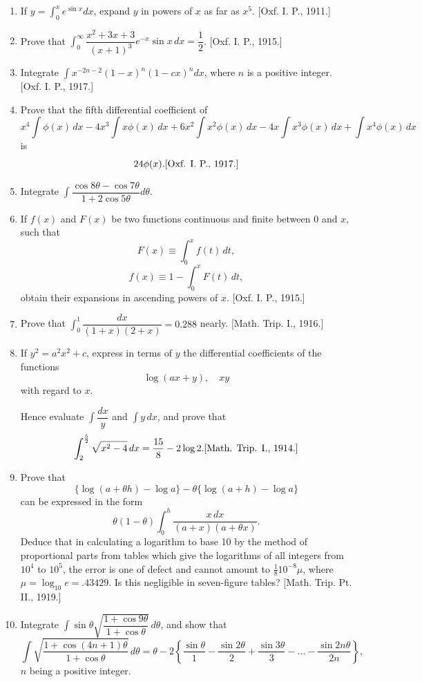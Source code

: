 \documentclass[11pt, a4paper]{article}
\newcommand{\source}[1]{\hfill\textnormal{[#1]}}
\begin{document}
\begin{enumerate}[leftmargin=2em]
\item If $y=\displaystyle\int_0^x e^{\sin x}dx$, expand $y$ in powers of $x$ as far as $x^5$. \source{Oxf. I. P., 1911.}

\item Prove that $\displaystyle\int_0^\infty \dfrac{x^2+3x+3}{(x+1)^3}e^{-x}\sin x\, dx = \dfrac12$. \source{Oxf. I. P., 1915.}

\item Integrate $\displaystyle\int x^{-2n-2}(1-x)^n(1-cx)^n dx$, where $n$ is a positive integer. \source{Oxf. I. P., 1917.}

\item Prove that the fifth differential coefficient of
\[
x^4\int \phi(x)\, dx - 4x^3\int x\phi(x)\, dx + 6x^2\int x^2\phi(x)\, dx - 4x\int x^3\phi(x)\, dx + \int x^4\phi(x)\, dx
\]
is
\[
24\phi(x). \source{Oxf. I. P., 1917.}
\]

\item Integrate $\displaystyle\int \dfrac{\cos 8\theta - \cos 7\theta}{1+2\cos 5\theta}d\theta$.

\item If $f(x)$ and $F(x)$ be two functions continuous and finite between $0$ and $x$, such that
\[
F(x) \equiv \int_0^x f(t)\, dt,
\]
\[
f(x) \equiv 1-\int_0^x F(t)\, dt,
\]
obtain their expansions in ascending powers of $x$. \source{Oxf. I. P., 1915.}

\item Prove that $\displaystyle\int_0^1 \dfrac{dx}{(1+x)(2+x)} = 0.288$ nearly. \source{Math. Trip. I., 1916.}

\item If $y^2=a^2x^2+c$, express in terms of $y$ the differential coefficients of the functions
\[
\log(ax+y), \quad xy
\]
with regard to $x$.

Hence evaluate $\displaystyle\int \dfrac{dx}{y}$ and $\displaystyle\int y\, dx$, and prove that
\[
\int_2^{\frac{5}{2}}\sqrt{x^2-4}\, dx = \dfrac{15}{8}-2\log 2. \source{Math. Trip. I., 1914.}
\]

\item Prove that
\[
\{\log(a+\theta h)-\log a\}-\theta\{\log(a+h)-\log a\}
\]
can be expressed in the form
\[
\theta(1-\theta)\int_0^h \dfrac{x\, dx}{(a+x)(a+\theta x)}.
\]
Deduce that in calculating a logarithm to base 10 by the method of proportional parts from tables which give the logarithms of all integers from $10^4$ to $10^5$, the error is one of defect and cannot amount to $\frac18 10^{-8}\mu$, where $\mu = \log_{10}e = .43429$. Is this negligible in seven-figure tables? \source{Math. Trip. Pt. II., 1919.}

\item Integrate $\displaystyle\int \sin\theta\sqrt{\dfrac{1+\cos 9\theta}{1+\cos\theta}}\, d\theta$, and show that
\[
\int \sqrt{\dfrac{1+\cos(4n+1)\theta}{1+\cos\theta}}\, d\theta = \theta - 2\left\{\dfrac{\sin\theta}{1}-\dfrac{\sin 2\theta}{2}+\dfrac{\sin3\theta}{3}-\dots-\dfrac{\sin 2n\theta}{2n}\right\},
\]
$n$ being a positive integer.

\end{enumerate}
\end{document}
